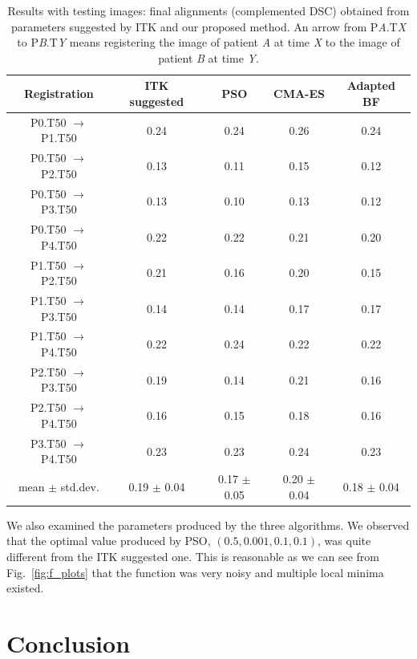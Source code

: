 \documentclass[]{spie}  %
\begin{document}
\begin{table}[t!]
\caption{Results with testing images: final alignments (complemented DSC) obtained from parameters suggested by ITK and our proposed method. An arrow from P\textit{A}.T\textit{X} to P\textit{B}.T\textit{Y} means registering the image of patient \textit{A} at time \textit{X} to the image of patient \textit{B} at time \textit{Y}.}
\label{tab:results_validation}
\begin{center}
%
\begin{tabular}{c|c|c|c|c}
\hline
Registration & ITK suggested & PSO & CMA-ES & Adapted BF \\
\hline \hline
P0.T50 $\rightarrow$ P1.T50 & 0.24 & 0.24 & 0.26 & 0.24 \\
\hline
P0.T50 $\rightarrow$ P2.T50 & 0.13 & 0.11 & 0.15 & 0.12 \\
\hline
P0.T50 $\rightarrow$ P3.T50 & 0.13 & 0.10 & 0.13 & 0.12 \\
\hline
P0.T50 $\rightarrow$ P4.T50 & 0.22 & 0.22 & 0.21 & 0.20 \\
\hline
P1.T50 $\rightarrow$ P2.T50 & 0.21 & 0.16 & 0.20 & 0.15 \\
\hline
P1.T50 $\rightarrow$ P3.T50 & 0.14 & 0.14 & 0.17 & 0.17 \\
\hline
P1.T50 $\rightarrow$ P4.T50 & 0.22 & 0.24 & 0.22 & 0.22 \\
\hline
P2.T50 $\rightarrow$ P3.T50 & 0.19 & 0.14 & 0.21 & 0.16 \\
\hline
P2.T50 $\rightarrow$ P4.T50 & 0.16 & 0.15 & 0.18 & 0.16 \\
\hline
P3.T50 $\rightarrow$ P4.T50 & 0.23 & 0.23 & 0.24 & 0.23 \\
\hline \hline
mean $\pm$ std.dev. & 0.19 $\pm$ 0.04 & 0.17 $\pm$ 0.05 & 0.20 $\pm$ 0.04 & 0.18 $\pm$ 0.04 \\
\hline
\end{tabular}
%
\end{center}
\end{table}

We also examined the parameters produced by the three algorithms. We observed that the optimal value produced by PSO, $(0.5, 0.001, 0.1, 0.1)$, was quite different from the ITK suggested one. This is reasonable as we can see from Fig.~\ref{fig:f_plots} that the function was very noisy and multiple local minima existed.

\section{Conclusion}
\end{document}

